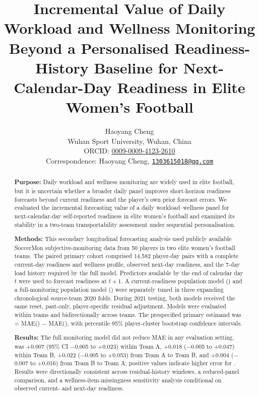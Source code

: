 \title{Incremental Value of Daily Workload and Wellness Monitoring Beyond a Personalised Readiness-History Baseline for Next-Calendar-Day Readiness in Elite Women's Football}

\author{Haoyang Cheng\\[0.25em]
\small Wuhan Sport University, Wuhan, China\\
\small ORCID: \href{https://orcid.org/0009-0009-4123-2610}{0009-0009-4123-2610}\\
\small Correspondence: Haoyang Cheng, \href{mailto:1303615018@qq.com}{\texttt{1303615018@qq.com}}}
\date{}

\maketitle

\begin{abstract}
\textbf{Purpose:} Daily workload and wellness monitoring are widely used in elite football, but it is uncertain whether a broader daily panel improves short-horizon readiness forecasts beyond current readiness and the player's own prior forecast errors. We evaluated the incremental forecasting value of a daily workload--wellness panel for next-calendar-day self-reported readiness in elite women's football and examined its stability in a two-team transportability assessment under sequential personalisation.

\textbf{Methods:} This secondary longitudinal forecasting analysis used publicly available SoccerMon subjective-monitoring data from 50 players in two elite women's football teams. The paired primary cohort comprised 14,582 player-day pairs with a complete current-day readiness and wellness profile, observed next-day readiness, and the 7-day load history required by the full model. Predictors available by the end of calendar day $t$ were used to forecast readiness at $t+1$. A current-readiness population model (\Pzero) and a full-monitoring population model (\Pone) were separately tuned in three expanding chronological source-team 2020 folds. During 2021 testing, both models received the same reset, past-only, player-specific residual adjustment. Models were evaluated within teams and bidirectionally across teams. The prespecified primary estimand was \DeltaMAE{} = MAE(\Pone) $-$ MAE(\Pzero), with percentile 95\% player-cluster bootstrap confidence intervals.

\textbf{Results:} The full monitoring model did not reduce MAE in any evaluation setting. \DeltaMAE{} was +0.007 (95\% CI $-$0.005 to +0.023) within Team A, +0.018 ($-$0.005 to +0.047) within Team B, +0.022 ($-$0.005 to +0.053) from Team A to Team B, and +0.004 ($-$0.007 to +0.016) from Team B to Team A; positive values indicate higher error for \Pone. Results were directionally consistent across residual-history windows, a reduced-panel comparison, and a wellness-item-missingness sensitivity analysis conditional on observed current- and next-day readiness.


\end{abstract}
